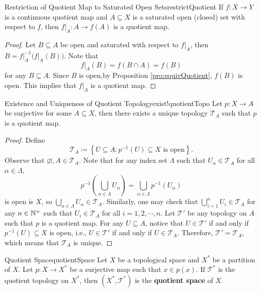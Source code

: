 \documentclass[math]{amznotes}
\theoremstyle{remark}
\begin{document}
\begin{probox}{Restriction of Quotient Map to Saturated Open Sets}{restrictQuotient}
    If $f \colon X \to Y$ is a continuous quotient map and $A \subseteq X$ is a saturated open (closed) set with respect to $f$, then $\left.f\right\rvert_A \colon A \to f\left(A\right)$ is a quotient map.
    \tcblower
    \begin{proof}
        Let $B \subseteq A$ be open and saturated with respect to $\left.f\right\rvert_A$, then $B = \left.f\right\rvert_A^{-1}\bigl(\left.f\right\rvert_A\left(B\right)\bigr)$. Note that 
        \begin{equation*}
            \left.f\right\rvert_A\left(B\right) = f\left(B \cap A\right) = f\left(B\right)
        \end{equation*}
        for any $B \subseteq A$. Since $B$ is open,by Proposition \ref{pro:equivQuotient}, $f\left(B\right)$ is open. This implies that $\left.f\right\rvert_A$ is a quotient map.
    \end{proof}
\end{probox}
\begin{probox}{Existence and Uniqueness of Quotient Topology}{exist!quotientTopo}
    Let $p \colon X \to A$ be surjective for some $A \subseteq X$, then there exists a unique topology $\mathcal{T}_A$ such that $p$ is a quotient map.
    \tcblower
    \begin{proof}
        Define 
        \begin{equation*}
            \mathcal{T}_A \coloneqq \left\{U \subseteq A \colon p^{-1}\left(U\right) \subseteq X \textrm{ is open}\right\}.
        \end{equation*}
        Observe that $\varnothing, A \in \mathcal{T}_A$. Note that for any index set $\Lambda$ such that $U_{\alpha} \in \mathcal{T}_A$ for all $\alpha \in \Lambda$,
        \begin{equation*}
            p^{-1}\left(\bigcup_{\alpha \in \Lambda}U_{\alpha}\right) = \bigcup_{\alpha \in \Lambda}p^{-1}\left(U_{\alpha}\right)
        \end{equation*}
        is open is $X$, so $\bigcup_{\alpha \in \Lambda}U_{\alpha} \in \mathcal{T}_A$. Similarly, one may check that $\bigcup_{i = 1}^nU_{i} \in \mathcal{T}_A$ for any $n \in \mathbb{N}^+$ such that $U_i \in \mathcal{T}_A$ for all $i = 1, 2, \cdots, n$. Let $\mathcal{T}'$ be any topology on $A$ such that $p$ is a quotient map. For any $U \subseteq A$, notice that $U \in \mathcal{T}'$ if and only if $p^{-1}\left(U\right) \subseteq X$ is open, i.e., $U \in \mathcal{T}'$ if and only if $U \in \mathcal{T}_A$. Therefore, $\mathcal{T}' = \mathcal{T}_A$, which means that $\mathcal{T}_A$ is unique.
    \end{proof}
\end{probox}
\begin{dfnbox}{Quotient Space}{quotientSpace}
    Let $X$ be a topological space and $X^*$ be a partition of $X$. Let $p \colon X \to X^*$ be a surjective map such that $x \in p\left(x\right)$. If $\mathcal{T}^*$ is the quotient topology on $X^*$, then $\left(X^*, \mathcal{T}^*\right)$ is the {\color{red} \textbf{quotient space}} of $X$.
\end{dfnbox}
\end{document}

